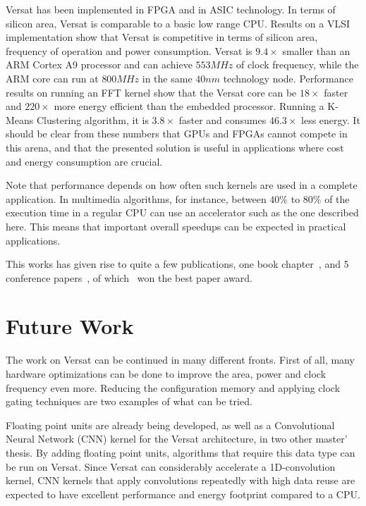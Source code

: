 Versat has been implemented in FPGA and in ASIC technology. In terms
of silicon area, Versat is comparable to a basic low range CPU.
Results on a VLSI implementation show that Versat is competitive in
terms of silicon area, frequency of operation and power
consumption. Versat is $9.4\times$ smaller than an ARM Cortex A9
processor and can achieve $553MHz$ of clock frequency, while the ARM
core can run at $800MHz$ in the same $40nm$ technology
node. Performance results on running an FFT kernel show that the
Versat core can be $18\times$ faster and $220\times$ more energy
efficient than the embedded processor. Running a K-Means Clustering
algorithm, it is $3.8\times$ faster and consumes $46.3\times$ less
energy. It should be clear from these numbers that GPUs and FPGAs
cannot compete in this arena, and that the presented solution is
useful in applications where cost and energy consumption are crucial.

Note that performance depends on how often such kernels are used in a
complete application. In multimedia algorithms, for instance, between
$40\%$ to $80\%$ of the execution time in a regular CPU can use an
accelerator such as the one described here. This means that important
overall speedups can be expected in practical applications.

This works has given rise to quite a few publications, one book
chapter~\cite{vecparBook16}, and 5 conference
papers~\cite{deSousa16,jcer16,rec17,fpl17,jcer17}, of
which~\cite{rec17} won the best paper award.

\section{Future Work}
\label{section:future}

The work on Versat can be continued in many different fronts. First of
all, many hardware optimizations can be done to improve the area,
power and clock frequency even more. Reducing the configuration memory
and applying clock gating techniques are two examples of what can be
tried.

Floating point units are already being developed, as well as a
Convolutional Neural Network (CNN) kernel for the Versat architecture,
in two other master' thesis. By adding floating point units,
algorithms that require this data type can be run on Versat. Since
Versat can considerably accelerate a 1D-convolution kernel, CNN
kernels that apply convolutions repeatedly with high data reuse are
expected to have excellent performance and energy footprint compared
to a CPU.

